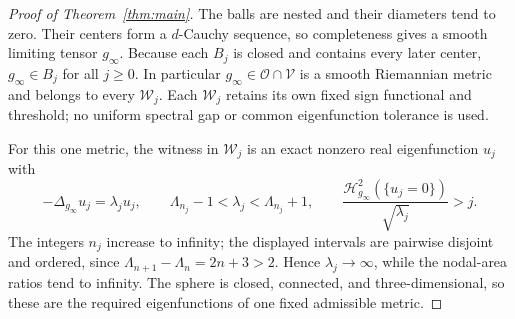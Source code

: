 \begin{proof}[Proof of Theorem~\ref{thm:main}]
The balls are nested and their diameters tend to zero.  Their centers
form a $d$-Cauchy sequence, so completeness gives a smooth limiting
tensor $g_\infty$.  Because each $B_j$ is closed and contains every
later center, $g_\infty\in B_j$ for all $j\ge0$.
In particular $g_\infty\in\mathcal O\cap\mathcal V$ is a smooth
Riemannian metric and belongs to every $\mathcal W_j$.
Each $\mathcal W_j$ retains its own fixed sign functional and
threshold; no uniform spectral gap or common eigenfunction tolerance
is used.

For this one metric, the witness in $\mathcal W_j$ is an exact
nonzero real eigenfunction $u_j$ with
\[
 -\Delta_{g_\infty}u_j=\lambda_ju_j,\qquad
 \Lambda_{n_j}-1<\lambda_j<\Lambda_{n_j}+1,
 \qquad
 \frac{\mathcal H_{g_\infty}^2(\{u_j=0\})}{\sqrt{\lambda_j}}>j.
\]
The integers $n_j$ increase to infinity; the displayed intervals are
pairwise disjoint and ordered, since
$\Lambda_{n+1}-\Lambda_n=2n+3>2$.  Hence
$\lambda_j\to\infty$, while the nodal-area ratios tend to infinity.
The sphere is closed, connected, and three-dimensional, so these are
the required eigenfunctions of one fixed admissible metric.
\end{proof}

